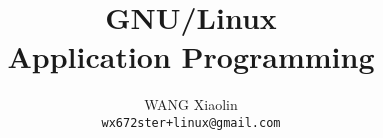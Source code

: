 \usepackage{wx672tut}



\newcommand{\textbooks}{\nocite{cs241, matthew2008beginning, cooper10bash, raymond2003art,
    stevens2013advanced, love:2007:lsp:1205435, kerrisk:2010:lpi:1869911,
    bryant2010computersystems}}%



\title{GNU/Linux\\Application Programming}
\author{WANG Xiaolin\\%
  {\footnotesize\texttt{wx672ster+linux@gmail.com}}}


